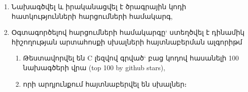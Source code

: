 {
	\begin{enumerate}
		\item
		Նախագծվել և իրականացվել է ծրագրային կոդի հատկությունների հարցումների համակարգ,

		\item
		Օգտագործելով հարցումների համակարգը` ստեղծվել է դինամիկ հիշողության արտահոսքի սխալների հայտնաբերման ալգորիթմ

        {
			\begin{enumerate}
				\item
				Թեստավորվել են C լեզվով գրված` բաց կոդով հասանելի 100 նախագծերի վրա (top 100 by github stars),
				\item որի արդյունքում հայտնաբերվել են սխալներ։
			\end{enumerate}
		}

	\end{enumerate}
}
